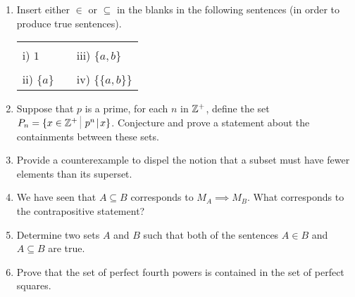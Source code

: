 \begin{enumerate}
\item Insert either $\in$ or $\subseteq$ in the blanks in the following 
sentences (in order to produce true sentences).

\begin{tabular}{lcl}
\rule{0pt}{16pt}i) $1$ \underline{\rule{36pt}{0pt}} $\{3, 2, 1, \{a, b\}\}$ & \rule{36pt}{0pt} & iii) $\{a, b\}$  \underline{\rule{36pt}{0pt}} $\{3, 2, 1, \{a, b\}\}$ \\
\rule{0pt}{16pt}ii) $\{a\}$ \underline{\rule{36pt}{0pt}} $\{a, \{a, b\}\}$ & &
iv) $\{\{a, b\}\}$  \underline{\rule{36pt}{0pt}} $\{a, \{a, b\}\}$ \\
\end{tabular}

\item  Suppose that $p$ is a prime, for each $n$ in ${\mathbb Z}^+$, 
define the set $P_n = \{ x \in \Integers^+ \suchthat \, p^n \divides x \}$.  
Conjecture and prove a statement about the containments between these sets.

\item  Provide a counterexample to dispel the notion that a subset must
have fewer elements than its superset.

\item  We have seen that $A \subseteq B$ corresponds to $M_A \implies M_B$.
What corresponds to the contrapositive statement?

\item Determine two sets $A$ and $B$ such that both of the sentences
$A \in B$ and $A \subseteq B$ are true.

\item Prove that the set of perfect fourth powers is contained in the
set of perfect squares.
\end{enumerate}




